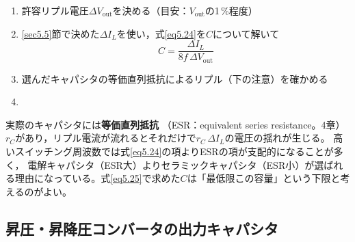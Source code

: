 \begin{screen}
\begin{enumerate}
\item 許容リプル電圧$\mathit{\Delta}V_{\mathrm{out}}$を決める（目安：$V_{\mathrm{out}}$の1\,\%程度）
\item \ref{sec5.5}節で決めた$\mathit{\Delta}I_L$を使い，式\ref{eq5.24}を$C$について解いて
\begin{equation}
C = \frac{\mathit{\Delta}I_L}{8 f\, \mathit{\Delta}V_{\mathrm{out}}}
\label{eq5.25}
\end{equation}
\item 選んだキャパシタの等価直列抵抗によるリプル（下の注意）を確かめる
\item {}
\end{enumerate}
\end{screen}

\begin{注意}
実際のキャパシタには\textbf{等価直列抵抗}
（ESR：equivalent series resistance。4章）$r_C$があり，リプル電流が流れるとそれだけで$r_C\, \mathit{\Delta}I_L$の電圧の揺れが生じる。
高いスイッチング周波数では式\ref{eq5.24}の項よりESRの項が支配的になることが多く，
電解キャパシタ（ESR大）よりセラミックキャパシタ（ESR小）が選ばれる理由になっている。式\ref{eq5.25}で求めた$C$は「最低限この容量」という下限と考えるのがよい。
\end{注意}

\subsection{昇圧・昇降圧コンバータの出力キャパシタ}

